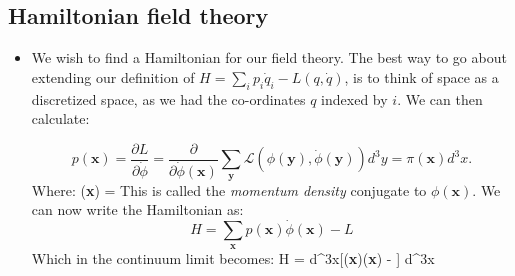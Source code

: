 \documentclass[11pt]{article}
\renewenvironment{flalign}{\vspace{-2mm}\empheq[box=\tcbhighmath]{align}}{\endempheq}
\numberwithin{equation}{section}
\begin{document}
\subsection{Hamiltonian field theory} 
\begin{itemize}
  \item We wish to find a Hamiltonian for our field theory. The best way to go about extending our definition of $H =\sum_i p_i \dot{q}_i  - L(q,\dot{q})$, is to think of space as a discretized space, as we had the co-ordinates $q$ indexed by $i$. We can then calculate:

  \begin{equation*}
  p(\textbf{x}) = \frac{\partial L}{\partial \dot{\phi}} = \frac{\partial }{\partial \dot{\phi}(\textbf{x})}\sum_{\textbf{y}}\mathcal{L}(\phi(\textbf{y}),\dot{\phi}(\textbf{y}))d^3y = \pi(\textbf{x})d^3x. 
  \end{equation*}
  Where:
  \begin{flalign}
  \label{pi}
  \pi(\textbf{x}) = 
  \end{flalign}
  This is called the \emph{momentum density} conjugate to $\phi(\textbf{x})$. We can now write the Hamiltonian as:
  \begin{equation*}
    H = \sum_{\textbf{x}}p(\textbf{x})\dot{\phi}(\textbf{x}) - L
  \end{equation*}
  Which in the continuum limit becomes:
  \begin{flalign}
\label{Hamiltonian}
     H = \int d^3x[\pi(\textbf{x})\dot{\phi}(\textbf{x}) - ] \equiv \int d^3x 
   \end{flalign} 
\end{itemize}
\end{document}
